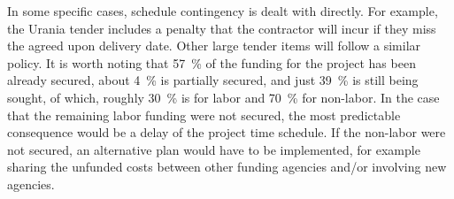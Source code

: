 In some specific cases, schedule contingency is dealt with directly. For example, the Urania tender includes a penalty that the contractor will incur if they miss the agreed upon delivery date. Other large tender items will follow a similar policy. It is worth noting that \SI{57}{\percent} of the funding for the project has been already secured, about \SI{4}{\percent} is partially secured, and just \SI{39}{\percent} is still being sought, of which, roughly \SI{30}{\percent} is for labor and \SI{70}{\percent} for non-labor.  In the case that the remaining labor funding were not secured, the most predictable consequence would be a delay of the project time schedule.  If the non-labor were not secured, an alternative plan would have to be implemented, for example sharing the unfunded costs between other funding agencies and/or involving new agencies.